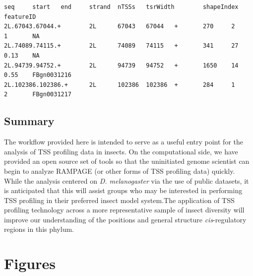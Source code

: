 \documentclass[runningheads,a4paper]{llncs}
\begin{document}
\begin{linenumbers}
\noindent
\begin{verbatim}
seq     start   end     strand  nTSSs   tsrWidth        shapeIndex      featureID
2L.67043.67044.+        2L      67043   67044   +       270     2       1       NA
2L.74089.74115.+        2L      74089   74115   +       341     27      0.13    NA
2L.94739.94752.+        2L      94739   94752   +       1650    14      0.55    FBgn0031216
2L.102386.102386.+      2L      102386  102386  +       284     1       2       FBgn0031217
\end{verbatim}

\subsection{Summary}
The workflow provided here is intended to serve as a useful entry point for the analysis of TSS profiling data in insects. 
On the computational side, we have provided an open source set of tools so that the uninitiated genome scientist can begin to analyze RAMPAGE (or other forms of TSS profiling data) quickly.
While the analysis centered on \textit{D. melanogaster} via the use of public datasets, it is anticipated that this will assist groups who may be interested in performing TSS profiling in their preferred insect model system.The application of TSS profiling technology across a more representative sample of insect diversity will improve our understanding of the positions and general structure \textit{cis}-regulatory regions in this phylum.

\section{Figures}


\end{linenumbers}
\end{document}
